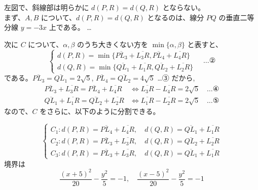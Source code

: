 \documentclass[../main.tex]{subfiles}
\begin{document}
\noindent
左図で、斜線部は明らかに $d(P,R) = d(Q,R)$ とならない。\\
まず、$A, B$ について、$d(P,R) = d(Q,R)$ となるのは、線分 $PQ$ の垂直二等分線 $y = -3x$ 上である。 \quad \dots {}

次に $C$ について、$\alpha,\beta$ のうち大きくない方を $\min\{\alpha,\beta\}$ と表すと、
\[
  \begin{cases}
    d(P,R) = \min \{ \overline{PL_3} + \overline{L_3R}, \overline{PL_4} + \overline{L_4R} \} \\
    d(Q,R) = \min \{ \overline{QL_1} + \overline{L_1R}, \overline{QL_2} + \overline{L_2R} \}
  \end{cases}
  \quad \dots \text{②}
\]
である。$\overline{PL_3} = \overline{QL_1} = 2\sqrt{5}$, $\overline{PL_4} = \overline{QL_2} = 4\sqrt{5}$ \dots ③ だから,
\begin{align*}
  \overline{PL_3} + \overline{L_3R} = \overline{PL_4} + \overline{L_4R} &\iff \overline{L_3R} - \overline{L_4R} = 2\sqrt{5} \quad \dots \text{④} \\
  \overline{QL_1} + \overline{L_1R} = \overline{QL_2} + \overline{L_2R} &\iff \overline{L_1R} - \overline{L_2R} = 2\sqrt{5} \quad \dots \text{⑤}
\end{align*}
なので、$C$ をさらに、以下のように分割できる。

\begin{center}
\end{center}

\[
  \begin{cases}
    C_1 : d(P,R) = \overline{PL_4} + \overline{L_4R}, \quad d(Q,R) = \overline{QL_1} + \overline{L_1R} \\
    C_2 : d(P,R) = \overline{PL_3} + \overline{L_3R}, \quad d(Q,R) = \overline{QL_2} + \overline{L_2R} \\
    C_3 : d(P,R) = \overline{PL_3} + \overline{L_3R}, \quad d(Q,R) = \overline{QL_1} + \overline{L_1R}
  \end{cases}
\]
境界は
\[
  \frac{(x+5)^2}{20} - \frac{y^2}{5} = -1, \quad \frac{(x-5)^2}{20} - \frac{y^2}{5} = -1
\]
\end{document}
